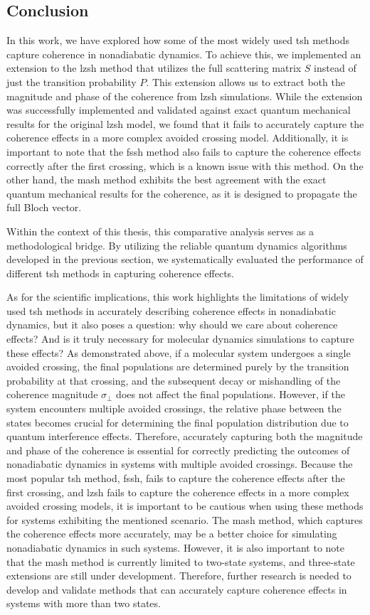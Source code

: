 \subsection{Conclusion}
In this work, we have explored how some of the most widely used \gls{tsh} methods capture coherence in nonadiabatic dynamics. To achieve this, we implemented an extension to the \gls{lzsh} method that utilizes the full scattering matrix $S$ instead of just the transition probability $P$. This extension allows us to extract both the magnitude and phase of the coherence from \gls{lzsh} simulations. While the extension was successfully implemented and validated against exact quantum mechanical results for the original \gls{lzsh} model, we found that it fails to accurately capture the coherence effects in a more complex avoided crossing model. Additionally, it is important to note that the \gls{fssh} method also fails to capture the coherence effects correctly after the first crossing, which is a known issue with this method. On the other hand, the \gls{mash} method exhibits the best agreement with the exact quantum mechanical results for the coherence, as it is designed to propagate the full Bloch vector.

Within the context of this thesis, this comparative analysis serves as a methodological bridge. By utilizing the reliable quantum dynamics algorithms developed in the previous section, we systematically evaluated the performance of different \gls{tsh} methods in capturing coherence effects.

As for the scientific implications, this work highlights the limitations of widely used \gls{tsh} methods in accurately describing coherence effects in nonadiabatic dynamics, but it also poses a question: why should we care about coherence effects? And is it truly necessary for molecular dynamics simulations to capture these effects? As demonstrated above, if a molecular system undergoes a single avoided crossing, the final populations are determined purely by the transition probability at that crossing, and the subsequent decay or mishandling of the coherence magnitude $\sigma_\perp$ does not affect the final populations. However, if the system encounters multiple avoided crossings, the relative phase between the states becomes crucial for determining the final population distribution due to quantum interference effects. Therefore, accurately capturing both the magnitude and phase of the coherence is essential for correctly predicting the outcomes of nonadiabatic dynamics in systems with multiple avoided crossings. Because the most popular \gls{tsh} method, \gls{fssh}, fails to capture the coherence effects after the first crossing, and \gls{lzsh} fails to capture the coherence effects in a more complex avoided crossing models, it is important to be cautious when using these methods for systems exhibiting the mentioned scenario. The \gls{mash} method, which captures the coherence effects more accurately, may be a better choice for simulating nonadiabatic dynamics in such systems. However, it is also important to note that the \gls{mash} method is currently limited to two-state systems, and three-state extensions are still under development. Therefore, further research is needed to develop and validate methods that can accurately capture coherence effects in systems with more than two states.
